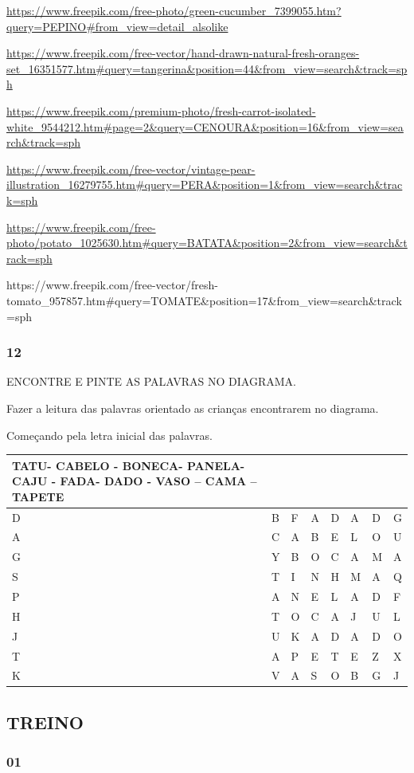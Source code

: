 \url{https://www.freepik.com/free-photo/green-cucumber_7399055.htm?query=PEPINO\#from_view=detail_alsolike}

\url{https://www.freepik.com/free-vector/hand-drawn-natural-fresh-oranges-set_16351577.htm\#query=tangerina\&position=44\&from_view=search\&track=sph}

\url{https://www.freepik.com/premium-photo/fresh-carrot-isolated-white_9544212.htm\#page=2\&query=CENOURA\&position=16\&from_view=search\&track=sph}

\url{https://www.freepik.com/free-vector/vintage-pear-illustration_16279755.htm\#query=PERA\&position=1\&from_view=search\&track=sph}

\url{https://www.freepik.com/free-photo/potato_1025630.htm\#query=BATATA\&position=2\&from_view=search\&track=sph}

https://www.freepik.com/free-vector/fresh-tomato\_957857.htm\#query=TOMATE\&position=17\&from\_view=search\&track=sph

\subsubsection{12 }\label{section-11}

ENCONTRE E PINTE AS PALAVRAS NO DIAGRAMA.

Fazer a leitura das palavras orientado as crianças encontrarem no
diagrama.

Começando pela letra inicial das palavras.

\begin{longtable}[]{@{}llllllll@{}}
\toprule
TATU- CABELO - BONECA- PANELA- CAJU - FADA- DADO - VASO -- CAMA --
TAPETE\tabularnewline
\midrule
\endhead
D & B & F & A & D & A & D & G\tabularnewline
A & C & A & B & E & L & O & U\tabularnewline
G & Y & B & O & C & A & M & A\tabularnewline
S & T & I & N & H & M & A & Q\tabularnewline
P & A & N & E & L & A & D & F\tabularnewline
H & T & O & C & A & J & U & L\tabularnewline
J & U & K & A & D & A & D & O\tabularnewline
T & A & P & E & T & E & Z & X\tabularnewline
K & V & A & S & O & B & G & J\tabularnewline
\bottomrule
\end{longtable}

\protect\hypertarget{_Hlk128550489}{}{}

\subsection{TREINO}\label{treino}

\subsubsection{01}\label{section-12}

